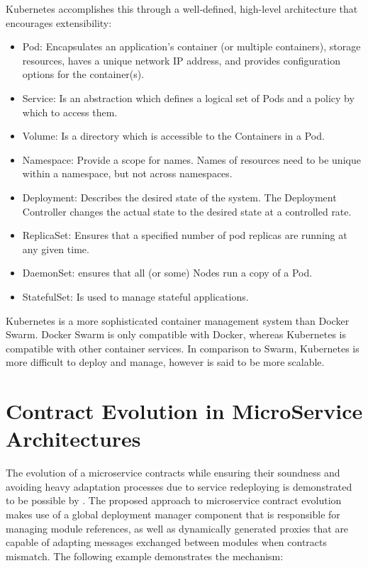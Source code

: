 Kubernetes accomplishes this through a well-defined, high-level architecture that encourages extensibility:

\begin{itemize}
    \item Pod: Encapsulates an application's container (or multiple containers),
    storage resources, haves a unique network IP address, and provides configuration options for the container(s).
    \item Service: Is an abstraction which defines a logical set
    of Pods and a policy by which to access them.
    \item Volume: Is a directory which is accessible to the
    Containers in a Pod.
    \item Namespace: Provide a scope for names. Names
    of resources need to be unique within a namespace, but not
    across namespaces.
    \item Deployment: Describes the desired state of the system. The
    Deployment Controller changes the actual state to the desired
    state at a controlled rate.
    \item ReplicaSet: Ensures that a specified number of pod replicas
    are running at any given time.
    \item DaemonSet: ensures that all (or some) Nodes run a copy of
    a Pod.
    \item StatefulSet: Is used to manage stateful applications.
\end{itemize}

Kubernetes is a more sophisticated container management system than Docker Swarm.
Docker Swarm is only compatible with Docker, whereas Kubernetes is compatible with other container services.
In comparison to Swarm, Kubernetes is more difficult to deploy and manage, however is said to be more scalable.

\section{Contract Evolution in MicroService Architectures} %
\label{sec:contract_evolution_in_microservice_architectures}

The evolution of a microservice contracts while ensuring their soundness and
avoiding heavy adaptation processes due to service redeploying is demonstrated to be possible by \citeauthor{seco2020robust} \cite{seco2020robust}.
The proposed approach to microservice contract evolution \cite{seco2020robust} makes use of a global deployment manager component that is responsible for managing module references,
as well as dynamically generated proxies that are capable of adapting messages exchanged between modules when contracts mismatch.
The following example demonstrates the mechanism:

